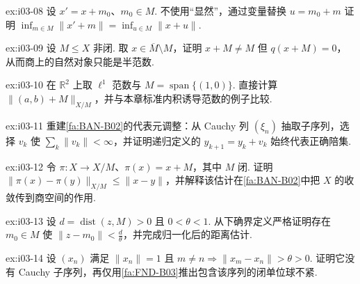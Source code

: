 \begin{FAExercise}[商半范数的代表元独立性]{ex:i03-08}
设 \(\displaystyle x'=x+m_0\)、\(\displaystyle m_0\in M\). 不使用“显然”，通过变量替换 \(\displaystyle u=m_0+m\) 证明 \(\displaystyle \inf_{m\in M}\|x'+m\|=\inf_{u\in M}\|x+u\|\).
\end{FAExercise}

\begin{FAExercise}[非闭子空间导致正定性失败]{ex:i03-09}
设 \(\displaystyle M\leqslant X\) 非闭. 取 \(\displaystyle x\in\overline M\setminus M\)，证明 \(\displaystyle x+M\neq M\) 但 \(\displaystyle q(x+M)=0\)，从而商上的自然对象只能是半范数.
\end{FAExercise}

\begin{FAExercise}[二维商范数]{ex:i03-10}
在 \(\displaystyle \mathbb R^2\) 上取 \(\displaystyle \ell^1\) 范数与 \(\displaystyle M=\operatorname{span}\{(1,0)\}\). 直接计算 \(\displaystyle \|(a,b)+M\|_{X/M}\)，并与本章标准内积诱导范数的例子比较.
\end{FAExercise}

\begin{FAExercise}[商Banach证明中的可求和修正]{ex:i03-11}
重建\autoref{fa:BAN-B02}的代表元调整：从 Cauchy 列 \(\displaystyle (\xi_n)\) 抽取子序列，选择 \(\displaystyle v_k\) 使 \(\displaystyle \sum_k\|v_k\|<\infty\)，并证明递归定义的 \(\displaystyle y_{k+1}=y_k+v_k\) 始终代表正确陪集.
\end{FAExercise}

\begin{FAExercise}[商映射的基本估计]{ex:i03-12}
令 \(\displaystyle \pi:X\to X/M\)、\(\displaystyle \pi(x)=x+M\)，其中 \(\displaystyle M\) 闭. 证明 \(\displaystyle \|\pi(x)-\pi(y)\|_{X/M}\leqslant\|x-y\|\)，并解释该估计在\autoref{fa:BAN-B02}中把 \(\displaystyle X\) 的收敛传到商空间的作用.
\end{FAExercise}

\begin{FAExercise}[Riesz引理的下确界步骤]{ex:i03-13}
设 \(\displaystyle d=\operatorname{dist}(z,M)>0\) 且 \(\displaystyle 0<\theta<1\). 从下确界定义严格证明存在 \(\displaystyle m_0\in M\) 使 \(\displaystyle \|z-m_0\|<\frac{d}{\theta}\)，并完成归一化后的距离估计.
\end{FAExercise}

\begin{FAExercise}[分离序列与非紧性]{ex:i03-14}
设 \(\displaystyle (x_n)\) 满足 \(\displaystyle \|x_n\|=1\) 且 \(\displaystyle m\neq n\Rightarrow\|x_m-x_n\|>\theta>0\). 证明它没有 Cauchy 子序列，再仅用\autoref{fa:FND-B03}推出包含该序列的闭单位球不紧.
\end{FAExercise}

